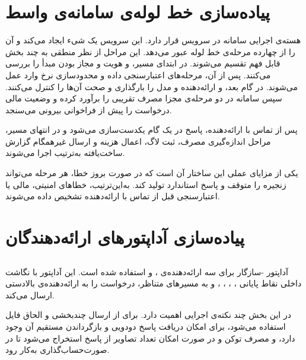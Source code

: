 \section{پیاده‌سازی خط لوله‌ی سامانه‌ی واسط}

هسته‌ی اجرایی سامانه در سرویس  قرار دارد. این سرویس
یک شیء  ایجاد می‌کند و آن را
از چهارده مرحله‌ی خط لوله عبور می‌دهد. این مراحل از نظر منطقی به چند بخش
قابل فهم تقسیم می‌شوند. در ابتدای مسیر،  و
 هویت و مجاز بودن مبدأ را بررسی می‌کنند.
پس از آن، مرحله‌های اعتبارسنجی داده و محدودسازی نرخ وارد عمل می‌شوند.
در گام بعد،  و
 ارائه‌دهنده و مدل را بارگذاری و صحت
آن‌ها را کنترل می‌کنند. سپس سامانه در دو مرحله‌ی مجزا مصرف تقریبی را
برآورد کرده و وضعیت مالی درخواست را پیش از فراخوانی بیرونی می‌سنجد.

پس از تماس با ارائه‌دهنده، پاسخ در یک گام یکدست‌سازی می‌شود و در انتهای
مسیر، مراحل اندازه‌گیری مصرف، ثبت لاگ، اعمال هزینه و ارسال غیرهمگام گزارش
ساخت‌یافته به‌ترتیب اجرا می‌شوند.

یکی از مزایای عملی این ساختار آن است که در صورت بروز خطا، هر مرحله می‌تواند
زنجیره را متوقف و پاسخ استاندارد تولید کند. به‌این‌ترتیب، خطاهای امنیتی،
مالی یا اعتبارسنجی قبل از تماس با ارائه‌دهنده تشخیص داده می‌شوند.

\section{پیاده‌سازی آداپتورهای ارائه‌دهندگان}

\subsection{}

آداپتور -سازگار برای سه ارائه‌دهنده‌ی ،  و
 استفاده شده است. این آداپتور با نگاشت داخلی نقاط پایانی
، ، ، ،
 و  به مسیرهای متناظر، درخواست را
به ارائه‌دهنده‌ی بالادستی ارسال می‌کند.

در این بخش چند نکته‌ی اجرایی اهمیت دارد. برای
 از ارسال چندبخشی و الحاق فایل استفاده می‌شود،
برای  امکان دریافت پاسخ دودویی و بازگرداندن مستقیم آن
وجود دارد، و مصرف توکن و در صورت امکان تعداد تصاویر از پاسخ استخراج
می‌شود تا در صورت‌حساب‌گذاری به‌کار رود.

